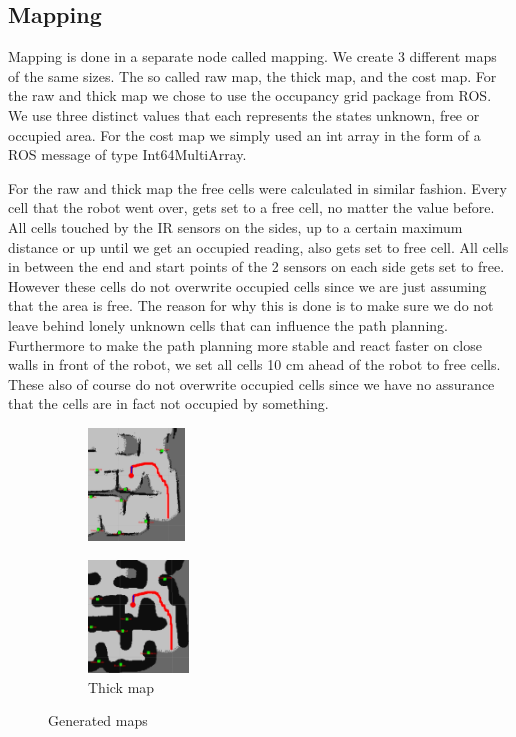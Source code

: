 \subsection{Mapping}
Mapping is done in a separate node called mapping. We create 3 different maps of the same sizes. The so called raw map, the thick map, and the cost map. For the raw and thick map we chose to use the occupancy grid package from ROS. We use three distinct values that each represents the states unknown, free or occupied area. For the cost map we simply used an int array in the form of a ROS message of type Int64MultiArray.

For the raw and thick map the free cells were calculated in similar fashion. Every cell that the robot went over, gets set to a free cell, no matter the value before. All cells touched by the IR sensors on the sides, up to a certain maximum distance or up until we get an occupied reading, also gets set to free cell. All cells in between the end and start points of the 2 sensors on each side gets set to free. However these cells do not overwrite occupied cells since we are just assuming that the area is free. The reason for why this is done is to make sure we do not leave behind lonely unknown cells that can influence the path planning. Furthermore to make the path planning more stable and react faster on close walls in front of the robot, we set all cells 10 cm ahead of the robot to free cells. These also of course do not overwrite occupied cells since we have no assurance that the cells are in fact not occupied by something. 

\begin{figure}[h]
        \centering
        \begin{subfigure}[b]{0.45\linewidth}
        \centering
                \includegraphics[height=3cm]{figures/raw_map.png}
                \label{fig:raw_map}
        \end{subfigure}        
        \begin{subfigure}[b]{0.45\linewidth}
        \centering
                \includegraphics[height=3cm]{figures/thick_map.png}
                \caption{Thick map}
                \label{fig:thick_map}
        \end{subfigure}
        \caption{Generated maps}
        \label{fig:maps}
\end{figure}

